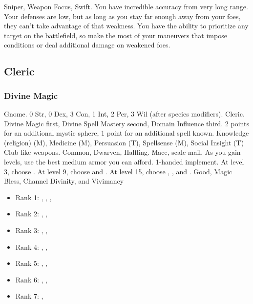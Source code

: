              Sniper, Weapon Focus, Swift.
             You have incredible accuracy from very long range.
            Your defenses are low, but as long as you stay far enough away from your foes, they can't take advantage of that weakness.
            You have the ability to prioritize any target on the battlefield, so make the most of your maneuvers that impose conditions or deal additional damage on weakened foes.

    \subsection{Cleric}

        \subsubsection{Divine Magic}
             Gnome.
             0 Str, 0 Dex, 3 Con, 1 Int, 2 Per, 3 Wil (after species modifiers).
             Cleric.
             Divine Magic first, Divine Spell Mastery second, Domain Influence third.
             2 points for an additional mystic sphere, 1 point for an additional spell known.
             Knowledge (religion) (M), Medicine (M), Persuasion (T), Spellsense (M), Social Insight (T)
             Club-like weapons.
             Common, Dwarven, Halfling.
             Mace, scale mail. As you gain levels, use the best medium armor you can afford.
             1-handed implement.
                At level 3, choose .
                At level 9, choose  and .
                At level 15, choose , , and .
             Good, Magic
             Bless, Channel Divinity, and Vivimancy
            \begin{itemize}
                \item Rank 1: , , , 
                \item Rank 2: , , 
                \item Rank 3: , , 
                \item Rank 4: , , 
                \item Rank 5: , , 
                \item Rank 6: , , 
                \item Rank 7: , 
            \end{itemize}
